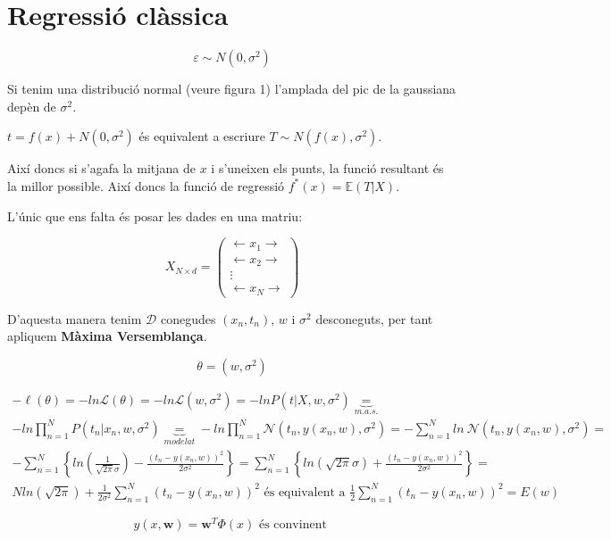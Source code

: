 \documentclass[a4paper]{article}
\begin{document}
\section{Regressió clàssica}

$$
\varepsilon \sim N(0, \sigma^2)
$$

Si tenim una distribució normal (veure figura 1) l'amplada del pic de la gaussiana depèn de $\sigma^2$.



$ t = f(x) + N(0, \sigma^2) $ és equivalent a escriure $T \sim N(f(x), \sigma^2) $.

Així doncs si s'agafa la mitjana de $x$ i s'uneixen els punts, la funció resultant és la millor possible. Així doncs la funció de regressió $f^*(x) = \mathbb{E}(T|X)$.

L'únic que ens falta és posar les dades en una matriu:

$$
X_{N \times d} =
\begin{pmatrix}
\longleftarrow x_1 \longrightarrow \\
\longleftarrow x_2 \longrightarrow \\
\vdots \\
\longleftarrow x_N \longrightarrow
\end{pmatrix}
$$

D'aquesta manera tenim $\mathcal{D}$ conegudes $(x_n, t_n)$, $w$ i $\sigma^2$ desconeguts, per tant apliquem \textbf{Màxima Versemblança}.

$$
\theta = (w, \sigma^2)
$$

\begin{gather*}
-\ell (\theta) = -ln \mathcal{L} (\theta) = 
-ln \mathcal{L}(w, \sigma^2) =
-ln P(t | X, w, \sigma^2) \underbrace{=}_{m.a.s.} \\
-ln \prod_{n=1}^N P(t_n | x_n, w, \sigma^2) \underbrace{=}_{modelat}
-ln \prod_{n=1}^N \mathcal{N} (t_n, y(x_n, w), \sigma^2) =
- \sum_{n=1}^N ln \ \mathcal{N} (t_n, y(x_n, w), \sigma^2) = \\
- \sum_{n=1}^N \left\{ ln \left( \frac{1}{\sqrt{2\pi}\sigma} \right) - \frac{(t_n - y(x_n, w))^2}{2\sigma^2} \right\} = 
\sum_{n=1}^N \left\{ ln(\sqrt{2\pi}\sigma) + \frac{(t_n - y(x_n, w))^2}{2\sigma^2} \right\} = \\
N ln (\sqrt{2\pi}) + \frac{1}{2\sigma^2} \sum_{n=1}^N (t_n - y(x_n,w))^2 \text{ és equivalent a } \frac{1}{2} \sum_{n=1}^N (t_n - y(x_n, w))^2 = E(w)
\end{gather*}

$$
\boxed{y(x, \boldsymbol{w}) = \boldsymbol{w}^T \Phi(x)} \text{ és convinent }
$$
\end{document}

